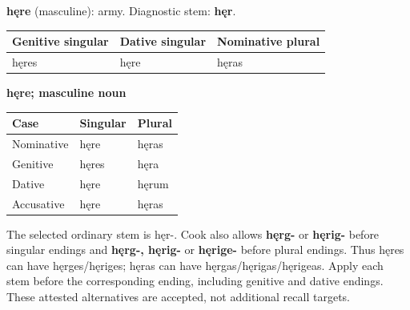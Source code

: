\textbf{hęre} (masculine): army. Diagnostic stem: \textbf{hęr}.

\par\begingroup
\fontsize{10.5}{13.2}\selectfont
\setlength{\LTleft}{0pt}\setlength{\LTright}{\fill}
\noindent
\begin{tabular}{@{}>{\raggedright\arraybackslash}p{39.24mm}>{\raggedright\arraybackslash}p{36.31mm}>{\raggedright\arraybackslash}p{42.82mm}@{}}
\toprule
\textbf{Genitive singular} & \textbf{Dative singular} & \textbf{Nominative plural} \\
\midrule
hęres & hęre & hęras \\
\bottomrule
\end{tabular}
\par\endgroup

\textbf{hęre; masculine noun}

\par\begingroup
\fontsize{10.5}{13.2}\selectfont
\setlength{\LTleft}{0pt}\setlength{\LTright}{\fill}
\noindent
\begin{tabular}{@{}>{\raggedright\arraybackslash}p{39.46mm}>{\raggedright\arraybackslash}p{39.46mm}>{\raggedright\arraybackslash}p{39.46mm}@{}}
\toprule
\textbf{Case} & \textbf{Singular} & \textbf{Plural} \\
\midrule
Nominative & hęre & hęras \\
Genitive & hęres & hęra \\
Dative & hęre & hęrum \\
Accusative & hęre & hęras \\
\bottomrule
\end{tabular}
\par\endgroup

The selected ordinary stem is hęr-. Cook also allows \textbf{hęrg-} or \textbf{hęrig-} before singular endings and \textbf{hęrg-, hęrig-} or \textbf{hęrige-} before plural endings. Thus hęres can have hęrges/\allowbreak{}hęriges; hęras can have hęrgas/\allowbreak{}hęrigas/\allowbreak{}hęrigeas. Apply each stem before the corresponding ending, including genitive and dative endings. These attested alternatives are accepted, not additional recall targets.

